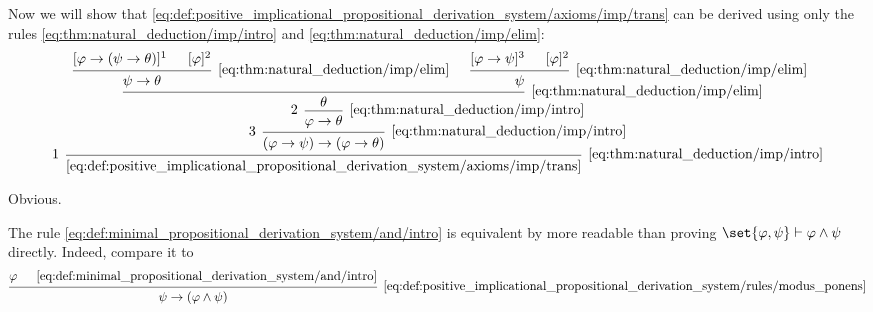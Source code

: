 \begin{proposition}
\begin{proposition}
  Now we will show that \eqref{eq:def:positive_implicational_propositional_derivation_system/axioms/imp/trans} can be derived using only the rules \eqref{eq:thm:natural_deduction/imp/intro} and \eqref{eq:thm:natural_deduction/imp/elim}:
  \begin{equation}\label{eq:thm:natural_deduction/imp/trans_derivation}
    \begin{prooftree}
      \hypo{ [\varphi \rightarrow (\psi \rightarrow \theta)]^1 }
      \hypo{ [\varphi]^2 }
      \infer2[\ref{eq:thm:natural_deduction/imp/elim}]{ \psi \rightarrow \theta }

      \hypo{ [\varphi \rightarrow \psi]^3 }
      \hypo{ [\varphi]^2 }
      \infer2[\ref{eq:thm:natural_deduction/imp/elim}]{ \psi }

      \infer2[\ref{eq:thm:natural_deduction/imp/elim}]{ \theta }

      \infer[left label=\( 2 \)]1[\ref{eq:thm:natural_deduction/imp/intro}]{ \varphi \rightarrow \theta }
      \infer[left label=\( 3 \)]1[\ref{eq:thm:natural_deduction/imp/intro}]{ (\varphi \rightarrow \psi) \rightarrow (\varphi \rightarrow \theta) }
      \infer[left label=\( 1 \)]1[\ref{eq:thm:natural_deduction/imp/intro}]{ \eqref{eq:def:positive_implicational_propositional_derivation_system/axioms/imp/trans} }
    \end{prooftree}
  \end{equation}

   Obvious.

   The rule \eqref{eq:def:minimal_propositional_derivation_system/and/intro} is equivalent by more readable than proving \( \set{ \varphi, \psi } \vdash \varphi \wedge \psi \) directly. Indeed, compare it to
  \begin{equation*}
    \begin{prooftree}
      \hypo{ \varphi }
      \hypo{ \eqref{eq:def:minimal_propositional_derivation_system/and/intro} }
      \infer2[\ref{eq:def:positive_implicational_propositional_derivation_system/rules/modus_ponens}]{ \psi \rightarrow (\varphi \wedge \psi) }


\end{prooftree}
\end{equation*}
\end{proposition}
\end{proposition}
